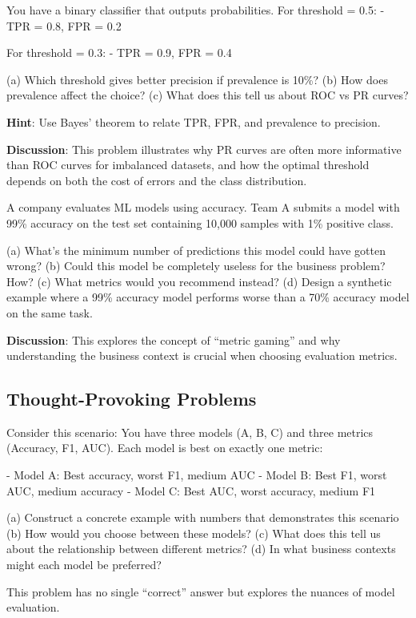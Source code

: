 \documentclass{article}
\newcounter{example}
\newcounter{exercise}
\begin{document}
\begin{tcolorbox}[colback=gray!5!white,colframe=gray!75!black,title=Problem \stepcounter{exercise}\#\theexercise: ROC Curve Analysis]
You have a binary classifier that outputs probabilities. For threshold = 0.5:
- TPR = 0.8, FPR = 0.2

For threshold = 0.3:  
- TPR = 0.9, FPR = 0.4

(a) Which threshold gives better precision if prevalence is 10\%?
(b) How does prevalence affect the choice?
(c) What does this tell us about ROC vs PR curves?

\textbf{Hint}: Use Bayes' theorem to relate TPR, FPR, and prevalence to precision.

\textbf{Discussion}:
This problem illustrates why PR curves are often more informative than ROC curves for imbalanced datasets, and how the optimal threshold depends on both the cost of errors and the class distribution.
\end{tcolorbox}

\begin{tcolorbox}[colback=gray!5!white,colframe=gray!75!black,title=Problem \stepcounter{exercise}\#\theexercise: Metric Gaming]
A company evaluates ML models using accuracy. Team A submits a model with 99\% accuracy on the test set containing 10,000 samples with 1\% positive class.

(a) What's the minimum number of predictions this model could have gotten wrong?
(b) Could this model be completely useless for the business problem? How?
(c) What metrics would you recommend instead?
(d) Design a synthetic example where a 99\% accuracy model performs worse than a 70\% accuracy model on the same task.

\textbf{Discussion}:
This explores the concept of ``metric gaming'' and why understanding the business context is crucial when choosing evaluation metrics.
\end{tcolorbox}

\subsection{Thought-Provoking Problems}

\begin{tcolorbox}[colback=gray!5!white,colframe=gray!75!black,title=Problem \stepcounter{exercise}\#\theexercise: The Evaluation Paradox]
Consider this scenario: You have three models (A, B, C) and three metrics (Accuracy, F1, AUC). Each model is best on exactly one metric:

- Model A: Best accuracy, worst F1, medium AUC
- Model B: Best F1, worst AUC, medium accuracy  
- Model C: Best AUC, worst accuracy, medium F1

(a) Construct a concrete example with numbers that demonstrates this scenario
(b) How would you choose between these models?
(c) What does this tell us about the relationship between different metrics?
(d) In what business contexts might each model be preferred?

This problem has no single ``correct'' answer but explores the nuances of model evaluation.
\end{tcolorbox}
\end{document}

